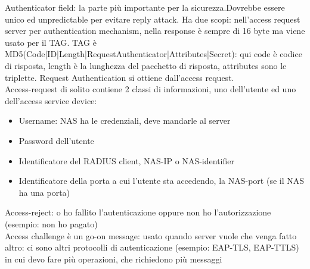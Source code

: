 \documentclass[16px]{article}
\begin{document}
Authenticator field: la parte più importante per la sicurezza.Dovrebbe essere unico ed unpredictable per evitare reply attack. Ha due scopi: nell'access request server per authentication mechanism, nella response è sempre di 16 byte ma viene usato per il TAG. TAG è MD5(Code|ID|Length|RequestAuthenticator|Attributes|Secret): qui code è codice di risposta, length è la lunghezza del pacchetto di risposta, attributes sono le triplette. Request Authentication si ottiene dall'access request.\\ Access-request di solito contiene 2 classi di informazioni, uno dell'utente ed uno dell'access service device:
\begin{itemize}
\item Username: NAS ha le credenziali, deve mandarle al server
\item Password dell'utente
\item Identificatore del RADIUS client, NAS-IP o NAS-identifier
\item Identificatore della porta a cui l'utente sta accedendo, la NAS-port (se il NAS ha una porta)
\end{itemize}
Access-reject: o ho fallito l'autenticazione oppure non ho l'autorizzazione (esempio: non ho pagato)\\
Access challenge è un go-on message: usato quando server vuole che venga fatto altro: ci sono altri protocolli di autenticazione (esempio: EAP-TLS, EAP-TTLS) in cui devo fare più operazioni, che richiedono più messaggi
\end{document}
